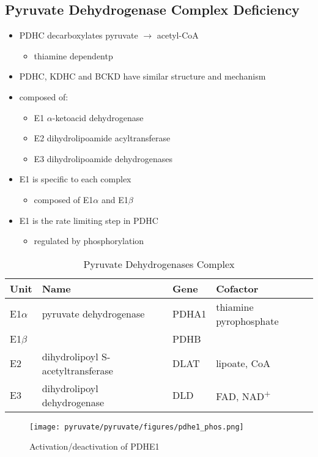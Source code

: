 \documentclass{scrartcl}
\begin{document}
\subsection{Pyruvate Dehydrogenase Complex Deficiency}
\label{sec:orgcb2ca68}
\begin{itemize}
\item PDHC decarboxylates pyruvate \(\to\) acetyl-CoA
\begin{itemize}
\item thiamine dependentp
\end{itemize}
\item PDHC, KDHC and BCKD have similar structure and mechanism
\item composed of:
\begin{itemize}
\item E1 \(\alpha\)-ketoacid dehydrogenase
\item E2 dihydrolipoamide acyltransferase
\item E3 dihydrolipoamide dehydrogenases
\end{itemize}
\item E1 is specific to each complex
\begin{itemize}
\item composed of E1\(\alpha\) and E1\(\beta\)
\end{itemize}
\item E1 is the rate limiting step in PDHC
\begin{itemize}
\item regulated by phosphorylation
\end{itemize}
\end{itemize}

\begin{table}[htbp]
\caption{\label{tab:org99eab38}Pyruvate Dehydrogenases Complex}
\centering
\begin{tabular}{llll}
Unit & Name & Gene & Cofactor\\
\hline
E1\(\alpha\) & pyruvate dehydrogenase & PDHA1 & thiamine pyrophosphate\\
E1\(\beta\) &  & PDHB & \\
E2 & dihydrolipoyl  S-acetyltransferase & DLAT & lipoate, CoA\\
E3 & dihydrolipoyl dehydrogenase & DLD & FAD, NAD\textsuperscript{+}\\
\end{tabular}
\end{table}

\begin{figure}[htbp]
\centering
\texttt{[image: pyruvate/pyruvate/figures/pdhe1\_phos.png]}
\caption[pdhe1]{\label{fig:org835152d}Activation/deactivation of PDHE1}
\end{figure}
\end{document}
